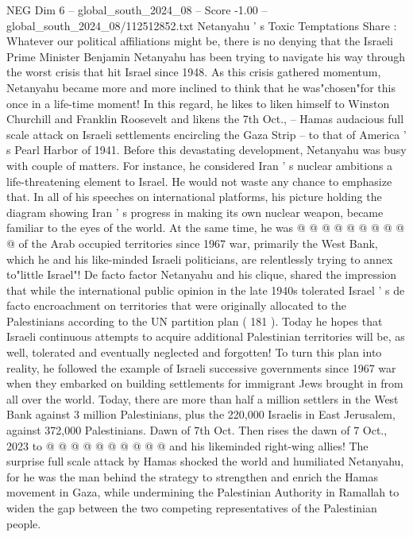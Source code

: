 \begin{textsample}{NEG Dim 6 – global\_south\_2024\_08 – Score -1.00 – global\_south\_2024\_08/112512852.txt}  \label{ex:f6_neg_065}
Netanyahu ' s Toxic Temptations Share : Whatever our political affiliations might be, there is no denying that the Israeli Prime Minister Benjamin Netanyahu has been trying to navigate his way through the worst crisis that hit Israel since 1948.
As this crisis gathered momentum, Netanyahu became more and more inclined to think that he was"chosen"for this once in a life-time moment!
In this regard, he likes to liken himself to Winston Churchill and Franklin Roosevelt and likens the 7th Oct., -- Hamas audacious full scale attack on Israeli settlements encircling the Gaza Strip -- to that of America ' s Pearl Harbor of 1941.
Before this devastating development, Netanyahu was busy with couple of matters.
For instance, he considered Iran ' s nuclear ambitions a life-threatening element to Israel.
He would not waste any chance to emphasize that.
In all of his speeches on international platforms, his picture holding the diagram showing Iran ' s progress in making its own nuclear weapon, became familiar to the eyes of the world.
At the same time, he was @ @ @ @ @ @ @ @ @ @ of the Arab occupied territories since 1967 war, primarily the West Bank, which he and his like-minded Israeli politicians, are relentlessly trying to annex to"little Israel"!
De facto factor Netanyahu and his clique, shared the impression that while the international public opinion in the late 1940s tolerated Israel ' s de facto encroachment on territories that were originally allocated to the Palestinians according to the UN partition plan ( 181 ).
Today he hopes that Israeli continuous attempts to acquire additional Palestinian territories will be, as well, tolerated and eventually neglected and forgotten!
To turn this plan into reality, he followed the example of Israeli successive governments since 1967 war when they embarked on building settlements for immigrant Jews brought in from all over the world.
Today, there are more than half a million settlers in the West Bank against 3 million Palestinians, plus the 220,000 Israelis in East Jerusalem, against 372,000 Palestinians.
Dawn of 7th Oct.
Then rises the dawn of 7 Oct., 2023 to @ @ @ @ @ @ @ @ @ @ and his likeminded right-wing allies!
The surprise full scale attack by Hamas shocked the world and humiliated Netanyahu, for he was the man behind the strategy to strengthen and enrich the Hamas movement in Gaza, while undermining the Palestinian Authority in Ramallah to widen the gap between the two competing representatives of the Palestinian people.

\end{textsample}
